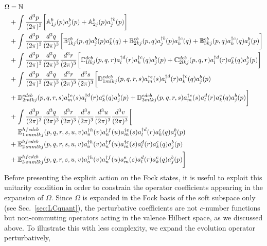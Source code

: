 \documentclass[a4paper,11pt]{article}
\def\mf#1{\mathbb{#1}}
\begin{document}
 \begin{align}\label{Eq:OmegaExp}
    \Omega  & = \mf{N} \notag \\ & +
                \int \frac{d^3p}{(2\pi)^3} 
                \bigg[ 
                   \mf{A}^{b}_{1j}(p)a^{b}_{j}(p) 
                +  \mf{A}^{b}_{2j} (p) a^{\dagger b}_{j}(p)\bigg] \notag \\ & 
               +\int \frac{d^3p}{(2\pi)^3} \frac{d^3q}{(2\pi)^3} 
               \bigg[\mf{B}^{cb}_{1kj}(p,q) a^{b}_{j}(p)a^{c}_{k}(q) 
                   + \mf{B}^{cb}_{2kj}(p,q) a^{\dagger b}_{j}(p)a^{\dagger c}_{k}(q)
               + \mf{B}^{cb}_{3kj} (p,q) a^{\dagger c}_{k}(q)a^{b}_{j}(p)
               \bigg] \notag \\ & 
               + \int 
               \frac{d^3p}{(2\pi)^3} \frac{d^3q}{(2\pi)^3} \frac{d^3r}{(2\pi)^3}
               \bigg[
                \mf{C}^{ dcb}_{1lkj}(p,q,r) a^{\dagger d}_{l}(r)  a^{\dagger c}_{k}(q)  a^{b}_{j}(p) 
               + \mf{C}^{dcb}_{2lkj}(p,q,r) a^{\dagger d}_{l}(r) a^{c}_{k}(q) a^{b}_{j}(p)\bigg]\notag \\ &  +\int \frac{d^3p}{(2\pi)^3} \frac{d^3q}{(2\pi)^3} \frac{d^3r}{(2\pi)^3} \frac{d^3s}{(2\pi)^3} \bigg[\mf{D}^{edcb}_{1mlkj}(p,q,r,s)a^{\dagger e}_{m}(s)a^{\dagger d}_{l}(r)a^{\dagger c}_{k}(q)a^{b}_{j}(p)\notag \\ & + \mf{D}^{edcb}_{2mlkj}(p,q,r,s)a^{\dagger e}_{m}(s)a^{\dagger d}_{l}(r)a^{c}_{k}(q)a^{b}_{j}(p)  + \mf{D}^{edcb}_{3mlkj}(p,q,r,s) a^{\dagger e}_{m}(s)a^{d}_{l}(r)a^{c}_{k}(q)a^{b}_{j}(p) \bigg] \notag \\ &
               + \int \frac{d^3p}{(2\pi)^3} \frac{d^3q}{(2\pi)^3} \frac{d^3r}{(2\pi)^3} \frac{d^3s}{(2\pi)^3} \frac{d^3u}{(2\pi)^3} \frac{d^3v}{(2\pi)^3}\bigg[\notag \\ & \hspace{1.25em}\mf{E}^{hfedcb}_{1\,onmlkj}(p,q,r,s,u,v)a^{\dagger h}_{o}(v)a^{\dagger f}_{n}(u)a^{\dagger e}_{m}(s)a^{\dagger d}_{l}(r)a^{c}_{k}(q)a^{b}_{j}(p) \notag \\ & + \mf{E}^{hfedcb}_{2\,onmlkj}(p,q,r,s,u,v)a^{\dagger h}_{o}(v)a^{\dagger f}_{n}(u)a^{\dagger e}_{m}(s)a^{d}_{l}(r)a^{c}_{k}(q)a^{b}_{j}(p) \notag \\ & + \mf{E}^{hfedcb}_{3\,onmlkj}(p,q,r,s,u,v)a^{\dagger h}_{o}(v)a^{\dagger f}_{n}(u)a^{e}_{m}(s)a^{d}_{l}(r)a^{c}_{k}(q)a^{b}_{j}(p) \bigg] 
\end{align} 
Before presenting the explicit action on the Fock states, it is useful to exploit this unitarity condition in order to constrain the operator coefficients appearing in the expansion of $\Omega$. {\color{chg}Since $\Omega$ is expanded in the Fock basis of the soft subspace only (see Sec.~\ref{sec:LCquant}), the perturbative coefficients are not $c$-number functions but non-commuting operators acting in the valence Hilbert space}, as we discussed above. To illustrate this with less complexity, we expand the evolution operator perturbatively,
\end{document}
